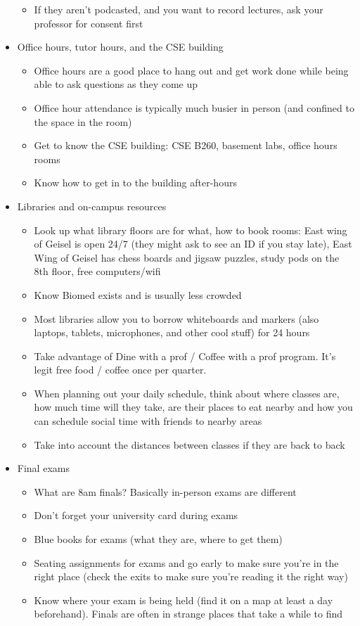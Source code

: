 \documentclass[12pt, oneside]{article}
\begin{document}
\begin{itemize}
\begin{itemize}
\item If they aren't podcasted, and you want to record lectures, ask your professor for consent first
\end{itemize}
\item Office hours, tutor hours, and the CSE building
\begin{itemize}
\item Office hours are a good place to hang out and get work done while being able to ask questions as they come up 
\item Office hour attendance is typically much busier in person (and confined to the space in the room)
\item Get to know the CSE building: CSE B260, basement labs, office hours rooms
\item Know how to get in to the building after-hours
\end{itemize}
\item Libraries and on-campus resources
\begin{itemize}
\item Look up what library floors are for what, how to book rooms: East wing of Geisel is open 24/7 (they might ask to see an ID if you stay late), East Wing of Geisel has chess boards and jigsaw puzzles, study pods on the 8th floor, 
free computers/wifi
\item Know Biomed exists and is usually less crowded
\item Most libraries allow you to borrow whiteboards and markers (also laptops, tablets, microphones, and other cool stuff) for 24 hours
\item Take advantage of Dine with a prof / Coffee with a prof program. It's legit free food / coffee once per quarter. 
\item When planning out your daily schedule, think about where classes are, how much time will they take, are their places to eat nearby and how you can schedule social time with friends to nearby areas 
\item Take into account the distances between classes if they are back to back
\end{itemize} 
\item Final exams
\begin{itemize}
\item What are 8am finals? Basically in-person exams are different
\item Don't forget your university card during exams
\item Blue books for exams (what they are, where to get them) 
\item Seating assignments for exams and go early to make sure you're in the right place (check the exits to make sure you're reading it the right way) 
\item Know where your exam is being held (find it on a map at least a day beforehand). Finals are often in strange places that take a while to find 
\end{itemize}
\end{itemize}
\end{document}
